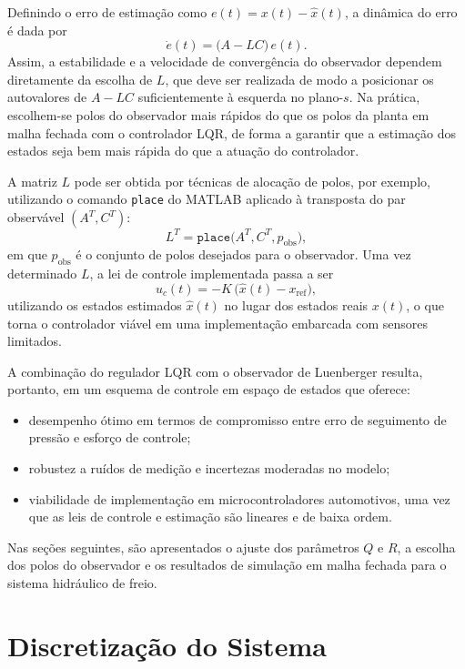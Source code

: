 Definindo o erro de estimação como $e(t) = x(t) - \hat{x}(t)$, a dinâmica do erro é dada por
\[
    \dot{e}(t) = \big(A - L C\big)\,e(t).
\]
Assim, a estabilidade e a velocidade de convergência do observador dependem diretamente da escolha de $L$, que deve ser realizada de modo a posicionar os autovalores de $A - LC$ suficientemente à esquerda no plano-$s$. Na prática, escolhem-se polos do observador mais rápidos do que os polos da planta em malha fechada com o controlador LQR, de forma a garantir que a estimação dos estados seja bem mais rápida do que a atuação do controlador.

A matriz $L$ pode ser obtida por técnicas de alocação de polos, por exemplo, utilizando o comando \texttt{place} do MATLAB aplicado à transposta do par observável $(A^{T}, C^{T})$:
\[
    L^{T} = \texttt{place}\big(A^{T}, C^{T}, p_{\text{obs}}\big),
\]
em que $p_{\text{obs}}$ é o conjunto de polos desejados para o observador. Uma vez determinado $L$, a lei de controle implementada passa a ser
\[
    u_c(t) = -K\,\big(\hat{x}(t) - x_{\text{ref}}\big),
\]
utilizando os estados estimados $\hat{x}(t)$ no lugar dos estados reais $x(t)$, o que torna o controlador viável em uma implementação embarcada com sensores limitados.

A combinação do regulador LQR com o observador de Luenberger resulta, portanto, em um esquema de controle em espaço de estados que oferece:
\begin{itemize}
    \item desempenho ótimo em termos de compromisso entre erro de seguimento de pressão e esforço de controle;
    \item robustez a ruídos de medição e incertezas moderadas no modelo;
    \item viabilidade de implementação em microcontroladores automotivos, uma vez que as leis de controle e estimação são lineares e de baixa ordem.
\end{itemize}
Nas seções seguintes, são apresentados o ajuste dos parâmetros $Q$ e $R$, a escolha dos polos do observador e os resultados de simulação em malha fechada para o sistema hidráulico de freio.

\section{Discretização do Sistema}
\label{sec:discretizacao-sistema}

